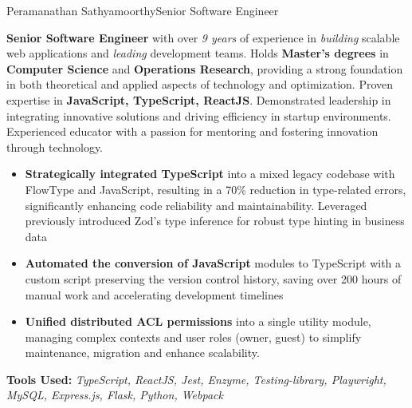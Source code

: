 \documentclass{article}
\begin{document}
\begin{cv}[cvpicture]{Peramanathan Sathyamoorthy}{Senior Software Engineer}



\textbf{Senior Software Engineer} with over \textit{9 years} of experience in \textit{building} scalable web applications and \textit{leading} development teams.
Holds \textbf{Master's degrees} in \textbf{Computer Science} and \textbf{Operations Research}, providing a strong foundation in both theoretical and applied aspects of technology and optimization.
Proven expertise in \textbf{JavaScript, TypeScript, ReactJS}. Demonstrated leadership in integrating innovative solutions and driving efficiency in startup environments.
Experienced educator with a passion for mentoring and fostering innovation through technology.



\begin{cvevent}[January 2023][December 2024]
    \begin{itemize}
        \setlength{\itemsep}{0.2em}
        \item \textbf{Strategically integrated TypeScript} into a mixed legacy codebase with FlowType and JavaScript, resulting in a 70\% reduction in type-related errors, significantly enhancing code reliability and maintainability. Leveraged previously introduced Zod's type inference for robust type hinting in business data

        \item \textbf{Automated the conversion of JavaScript} modules to TypeScript with a custom script preserving the version control history, saving over 200 hours of manual work and accelerating development timelines

        \item \textbf{Unified distributed ACL permissions} into a single utility module, managing complex contexts and user roles (owner, guest) to simplify maintenance, migration and enhance scalability.
    \end{itemize}
\end{cvevent}
\vspace{1em}
\textbf{Tools Used:} \textit{TypeScript, ReactJS, Jest, Enzyme, Testing-library, Playwright, MySQL, Express.js, Flask, Python, Webpack}


\end{cv}
\end{document}
